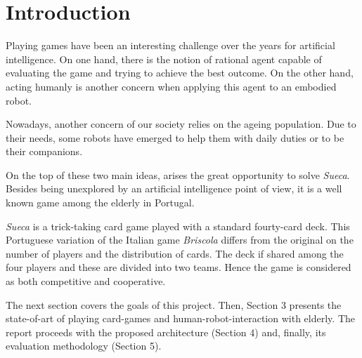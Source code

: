 \section{Introduction}
Playing games have been an interesting challenge over the years for artificial intelligence. On one hand, there is the notion of rational agent capable of evaluating the game and trying to achieve the best outcome. On the other hand, acting humanly is another concern when applying this agent to an embodied robot.

Nowadays, another concern of our society relies on the ageing population. Due to their needs, some robots have emerged to help them with daily duties or to be their companions.

On the top of these two main ideas, arises the great opportunity to solve \emph{Sueca}. Besides being unexplored by an artificial intelligence point of view, it is a well known game among the elderly in Portugal.

\emph{Sueca} is a trick-taking card game played with a standard fourty-card deck. This Portuguese variation of the Italian game \emph{Briscola} differs from the original on the number of players and the distribution of cards. The deck if shared among the four players and these are divided into two teams. Hence the game is considered as both competitive and cooperative.

The next section covers the goals of this project. Then, Section 3 presents the state-of-art of playing card-games and human-robot-interaction with elderly. The report proceeds with the proposed architecture (Section 4) and, finally, its evaluation methodology (Section 5). 